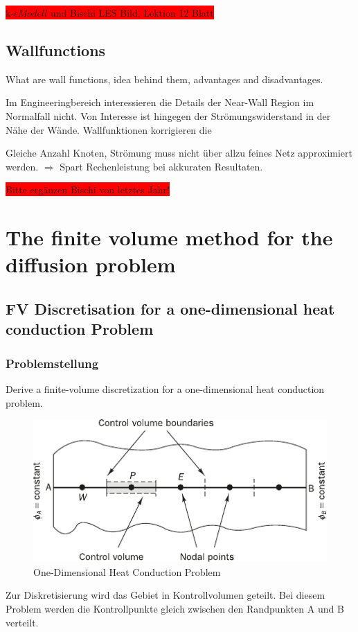 \documentclass[a4paper]{scrartcl}
\begin{document}
\colorbox{red}{k-$\epsilon Modell$ und Bischi LES Bild, Lektion 12 Blatt}


\subsection{Wallfunctions} 
What are wall functions, idea behind them, advantages
and disadvantages.

Im Engineeringbereich interessieren die Details der Near-Wall Region im
Normalfall nicht. Von Interesse ist hingegen der Strömungswiderstand in der Nähe
der Wände. Wallfunktionen korrigieren die

Gleiche Anzahl Knoten, Strömung muss nicht über allzu feines Netz approximiert
werden. $\Rightarrow$ Spart Rechenleistung bei akkuraten Resultaten.

 \colorbox{red}{Bitte ergänzen Bischi von letztes Jahr!}



\section{The finite volume method for the diffusion problem}


\subsection{FV Discretisation for a one-dimensional heat conduction Problem}
\subsubsection{Problemstellung}
Derive a finite-volume discretization for a one-dimensional heat conduction
problem. 

\begin{figure}[h]
\begin{center}
\includegraphics[scale=1]{images/41.pdf}
\caption{One-Dimensional Heat Conduction Problem}
\label{fig:41}
\end{center}
\end{figure}
Zur Diskretisierung wird das Gebiet in Kontrollvolumen geteilt. Bei diesem
Problem werden die Kontrollpunkte gleich zwischen den Randpunkten A und B
verteilt.
\end{document}
